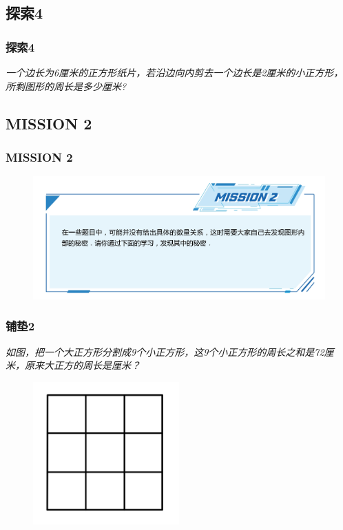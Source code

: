 \subsection{探索4}
\begin{frame}
    \frametitle{探索4}
    \textit{一个边长为6厘米的正方形纸片，若沿边向内剪去一个边长是2厘米的小正方形，所剩图形的周长是多少厘米?}
\end{frame}

\subsection{MISSION 2}
\begin{frame}
    \frametitle{MISSION 2}
    \begin{figure}[H] 
        \centering
        \includegraphics[width=1\textwidth]{./pics/Chapter_1/mission2.png}
    \end{figure}
\end{frame}

\begin{frame}
    \frametitle{铺垫2}
    \textit{如图，把一个大正方形分割成9个小正方形，这9个小正方形的周长之和是72厘米，原来大正方的周长是厘米？}
    \begin{figure}[H] 
        \centering
        \includegraphics[width=0.5\textwidth]{./pics/Chapter_1/pudian2.png}
    \end{figure}
\end{frame}


